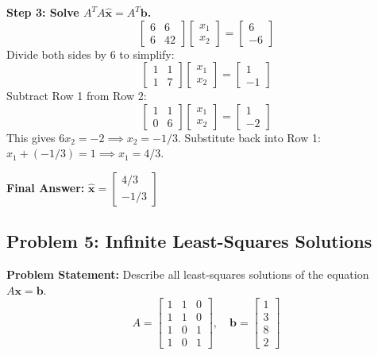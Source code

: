 \documentclass[11pt, letterpaper]{article}
\theoremstyle{definition}
\theoremstyle{remark}
\begin{document}
\textbf{Step 3: Solve $A^T A \hat{\mathbf{x}} = A^T \mathbf{b}$.}
\[
\begin{bmatrix} 6 & 6 \\ 6 & 42 \end{bmatrix} \begin{bmatrix} x_1 \\ x_2 \end{bmatrix} = \begin{bmatrix} 6 \\ -6 \end{bmatrix}
\]
Divide both sides by 6 to simplify:
\[
\begin{bmatrix} 1 & 1 \\ 1 & 7 \end{bmatrix} \begin{bmatrix} x_1 \\ x_2 \end{bmatrix} = \begin{bmatrix} 1 \\ -1 \end{bmatrix}
\]
Subtract Row 1 from Row 2:
\[
\begin{bmatrix} 1 & 1 \\ 0 & 6 \end{bmatrix} \begin{bmatrix} x_1 \\ x_2 \end{bmatrix} = \begin{bmatrix} 1 \\ -2 \end{bmatrix}
\]
This gives $6x_2 = -2 \implies x_2 = -1/3$.
Substitute back into Row 1: $x_1 + (-1/3) = 1 \implies x_1 = 4/3$.

\textbf{Final Answer:} $\hat{\mathbf{x}} = \begin{bmatrix} 4/3 \\ -1/3 \end{bmatrix}$

\vspace{1em}
\subsection{Problem 5: Infinite Least-Squares Solutions}
\textbf{Problem Statement:} Describe all least-squares solutions of the equation $A\mathbf{x} = \mathbf{b}$.
\[ A = \begin{bmatrix} 1 & 1 & 0 \\ 1 & 1 & 0 \\ 1 & 0 & 1 \\ 1 & 0 & 1 \end{bmatrix}, \quad \mathbf{b} = \begin{bmatrix} 1 \\ 3 \\ 8 \\ 2 \end{bmatrix} \]
\end{document}
